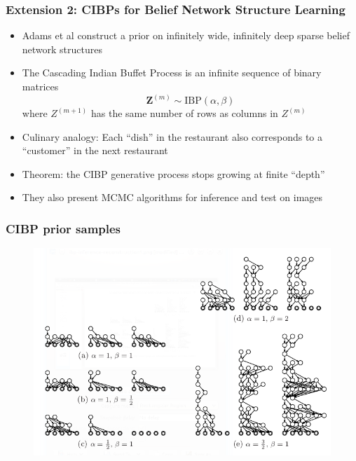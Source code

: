 \documentclass[13pt]{beamer}
\begin{document}
\begin{frame}
\frametitle{Extension 2: CIBPs for Belief Network Structure Learning}
\begin{itemize}
\item Adams et al construct a prior on infinitely wide, infinitely deep sparse belief network structures
\item The Cascading Indian Buffet Process is an infinite sequence of binary matrices $$\mathbf{Z}^{(m)} \sim \text{IBP}(\alpha,\beta)$$
    where $Z^{(m+1)}$ has the same number of rows as columns in $Z^{(m)}$
\item Culinary analogy: Each ``dish'' in the restaurant also corresponds to a ``customer'' in the next restaurant
\item Theorem: the CIBP generative process stops growing at finite ``depth''
\item They also present MCMC algorithms for inference and test on images
\end{itemize}
\end{frame}
\begin{frame}
\frametitle{CIBP prior samples}

\begin{figure}
\begin{center}
\includegraphics[scale=0.6]{./img/cibp-samples.png}
\end{center}
\end{figure}
\end{frame}
\end{document}
